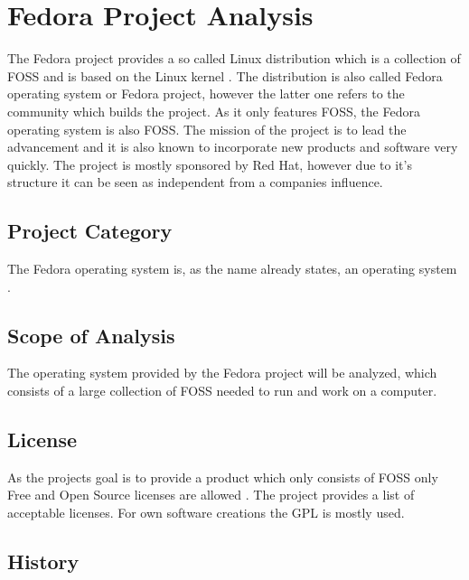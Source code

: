 
\section{Fedora Project Analysis} %


The Fedora project provides a so called Linux distribution which is a
collection of \ac{FOSS} and is based on the Linux kernel
\cite{FedoraAbout,FedoraTogami}. The distribution is also called Fedora
operating system or Fedora project, however the latter one refers to the
community which builds the project. As it only features \ac{FOSS}, the Fedora
operating system is also \ac{FOSS}. The mission of the project is to lead the
advancement and it is also known to incorporate new products and software very
quickly. The project is mostly sponsored by Red Hat, however due to it's
structure it can be seen as independent from a companies influence.

\subsection{Project Category}

The Fedora operating system is, as the name already states, an operating system
\cite{FedoraAbout}.

\subsection{Scope of Analysis}

The operating system provided by the Fedora project will be analyzed, which
consists of a large collection of \ac{FOSS} needed to run and work on a
computer.

\subsection{License}

As the projects goal is to provide a product which only consists of \ac{FOSS}
only Free and Open Source licenses are allowed \cite{FedoraLicensing}. The
project provides a list of acceptable licenses. For own software creations the
\ac{GPL} is mostly used.

\subsection{History}

